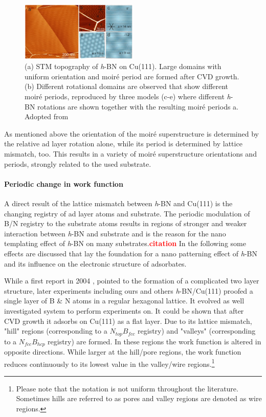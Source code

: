 \begin{figure} \centering
	\includegraphics[width=0.5\textwidth]{./images/h-BN-cvd-cu111.png}%
\caption{(a) STM topography of \textit{h}-BN on Cu(111). Large domains with uniform orientation and moir\'e period are formed after CVD growth. (b) Different rotational domains are observed that show different moir\'e periods, reproduced by three models (c-e) where different \textit{h}-BN rotations are shown together with the resulting moir\'e periods a. Adopted from \cite{joshi_boron_2012}}
\label{fig:moire-STM-model}
\end{figure}

As mentioned above the orientation of the moir\'e superstructure is determined by the relative ad layer rotation alone, while its period is determined by lattice mismatch, too. This results in a variety of moir\'e superstructure orientations and periods, strongly related to the used substrate.
	
\paragraph{Periodic change in work function}
A direct result of the lattice mismatch between \textit{h}-BN and Cu(111) is the changing registry of ad layer atoms and substrate. The periodic modulation of B/N registry to the substrate atoms results in regions of stronger and weaker interaction between \textit{h}-BN and substrate and is the reason for the nano templating effect of \textit{h}-BN on many substrates.\textcolor{red}{\textbf{citation}} In the following some effects are discussed that lay the foundation for a nano patterning effect of \textit{h}-BN and its influence on the electronic structure of adsorbates.

While a first report in 2004 \cite{corso_boron_2004}, pointed to the formation of a complicated two layer structure, later experiments \cite{roth_chemical_2013, li_grain_2015} including ours \cite{joshi_boron_2012, schwarz_corrugation_2017} and others \textit{h}-BN/Cu(111) proofed a single layer of B \& N atoms in a regular hexagonal lattice. It evolved as well investigated system to perform experiments on. It could be shown that after CVD growth it adsorbs on Cu(111) as a flat layer. Due to its  lattice mismatch, "hill" regions  (corresponding to a $N_{top}B_{fcc}$ registry) and "valleys" (corresponding to a $N_{fcc}B_{hcp}$ registry) are formed. In these regions the work function is altered in opposite directions. While larger at the hill/pore regions, the work function reduces continuously to its lowest value in the valley/wire regions.\footnote{Please note that the notation is not uniform throughout the literature. Sometimes hills are referred to as pores and valley regions are denoted as wire regions.} 

